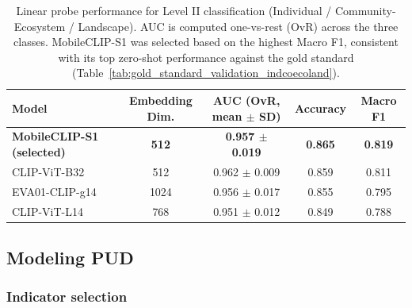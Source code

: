 \documentclass[hidelinks, 11pt]{article}
\begin{document}
\begin{table}[htbp]
\centering
\caption{Linear probe performance for Level II classification (Individual / Community-Ecosystem / Landscape). AUC is computed one-vs-rest (OvR) across the three classes. MobileCLIP-S1 was selected based on the highest Macro F1, consistent with its top zero-shot performance against the gold standard (Table~\ref{tab:gold_standard_validation_indcoecoland}).}
\label{tab:linearprobe_indcoecoland}
\begin{tabular}{@{}lcccc@{}}
\toprule
\textbf{Model} & \textbf{Embedding Dim.} & \textbf{AUC (OvR, mean $\pm$ SD)} & \textbf{Accuracy} & \textbf{Macro F1} \\
\midrule
\textbf{MobileCLIP-S1 (selected)} & \textbf{512}  & \textbf{0.957 $\pm$ 0.019} & \textbf{0.865} & \textbf{0.819} \\
CLIP-ViT-B32              & 512  & 0.962 $\pm$ 0.009 & 0.859 & 0.811 \\
EVA01-CLIP-g14            & 1024 & 0.956 $\pm$ 0.017 & 0.855 & 0.795 \\
CLIP-ViT-L14              & 768  & 0.951 $\pm$ 0.012 & 0.849 & 0.788 \\
\bottomrule
\end{tabular}
\end{table}

\subsection{Modeling PUD}
\subsubsection{Indicator selection}
\end{document}
